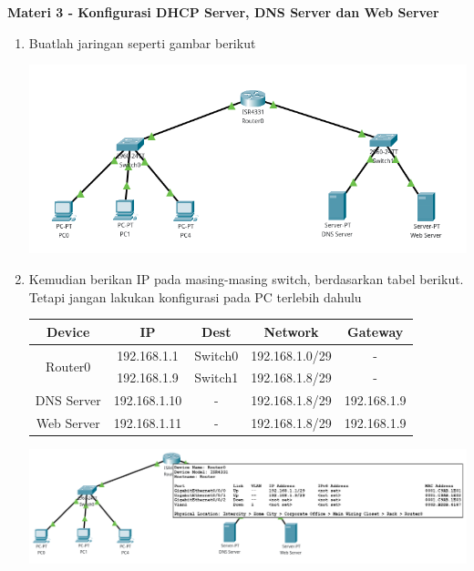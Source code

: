 \documentclass{article}
\begin{document}
    \newpage
    \begin{flushleft}
        \textbf{Materi 3 - Konfigurasi DHCP Server, DNS Server dan Web Server}
        \newline

        \begin{enumerate}
            \item Buatlah jaringan seperti gambar berikut

            \begin{center}
                \includegraphics[scale=0.5]{3-1.png}
            \end{center}

            \item Kemudian berikan IP pada masing-masing switch, berdasarkan tabel berikut. Tetapi jangan lakukan konfigurasi pada PC terlebih dahulu

            \begin{tabular}{|c|c|c|c|c|}
                \hline
                Device & IP & Dest & Network & Gateway \\
                \hline
                \multirow{2}{4em}{Router0} & 192.168.1.1 & Switch0 & 192.168.1.0/29 & - \\
                & 192.168.1.9 & Switch1 & 192.168.1.8/29 & - \\
                \hline
                DNS Server & 192.168.1.10 & - & 192.168.1.8/29 & 192.168.1.9\\
                \hline
                Web Server & 192.168.1.11 & - & 192.168.1.8/29 & 192.168.1.9\\
                \hline
            \end{tabular}
            
            \begin{center}
                \includegraphics[scale=0.3]{3-2.png}
            \end{center}


\end{enumerate}
\end{flushleft}
\end{document}
